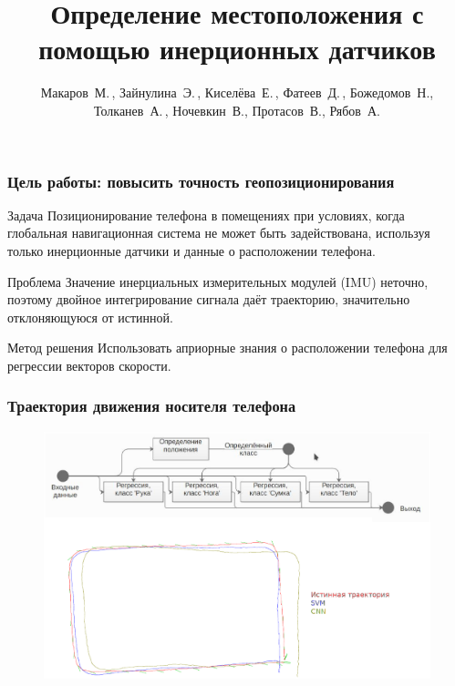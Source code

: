 \documentclass{beamer}
\title[\hbox to 56mm{Определение местоположения  \hfill\insertframenumber\,/\,\inserttotalframenumber}]
{Определение местоположения с помощью инерционных датчиков}
\author[Макаров~М.\,, Зайнулина~Э.]{Макаров~М.\,, Зайнулина~Э.\,, Киселёва~Е.\,, Фатеев~Д.\,,
    Божедомов~Н., Толканев~А.\,, Ночевкин~В.,
    Протасов~В., Рябов~А.} %
\institute[МФТИ] %
{\large
Московский физико-технический институт \\ %
\medskip
\textit{} %
}
\date{\footnotesize{\emph{Курс:} Численные методы обучения по прецедентам\par (практика, В.\,В. Стрижов)/Группа 694, весна 2019}}
\begin{document}
\begin{frame}
\titlepage %
\end{frame}

\begin{frame}
\frametitle{Цель работы: повысить точность геопозиционирования} %
\begin{block}{Задача}
    Позиционирование телефона в помещениях при условиях, когда глобальная навигационная система не может быть задействована, используя только инерционные датчики и данные о расположении телефона.
\end{block}

\begin{block}{Проблема}
    Значение инерциальных измерительных модулей (IMU) неточно, поэтому двойное интегрирование сигнала даёт траекторию, 
    значительно отклоняющуюся от истинной.
\end{block}

\begin{block}{Метод решения}
    Использовать априорные знания о расположении телефона для регрессии векторов скорости.
\end{block}
\end{frame}


\begin{frame}
\frametitle{Траектория движения носителя телефона}
\begin{figure}[H]
    \centering
    \includegraphics[scale=0.31]{images/title.eps}
\end{figure}
\end{frame}
\end{document}
